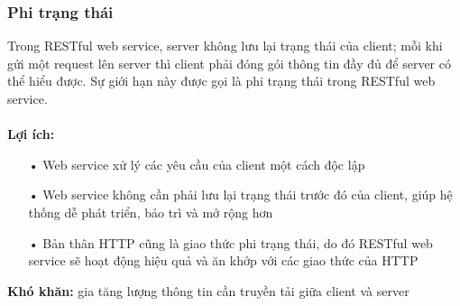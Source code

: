 \documentclass[a4paper]{article}
\begin{document}
\subsubsection{Phi trạng thái}
Trong RESTful web service, server không lưu lại trạng thái của client; mỗi khi gửi một request lên server thì client phải đóng gói thông tin đầy đủ để server có thể hiểu được. Sự giới hạn này được gọi là phi trạng thái trong RESTful web service.\\
\\
\textbf{Lợi ích:}
\begin{itemize}
	\item[•]Web service xử lý các yêu cầu của client một cách độc lập
	\item[•]Web service không cần phải lưu lại trạng thái trước đó của client, giúp hệ thống dễ phát triển, bảo trì và mở rộng hơn
	\item[•]Bản thân HTTP cũng là giao thức phi trạng thái, do đó RESTful web service sẽ hoạt động hiệu quả và ăn khớp với các giao thức của HTTP
\end{itemize}
\textbf{Khó khăn: }gia tăng lượng thông tin cần truyền tải giữa client và server
\end{document}
